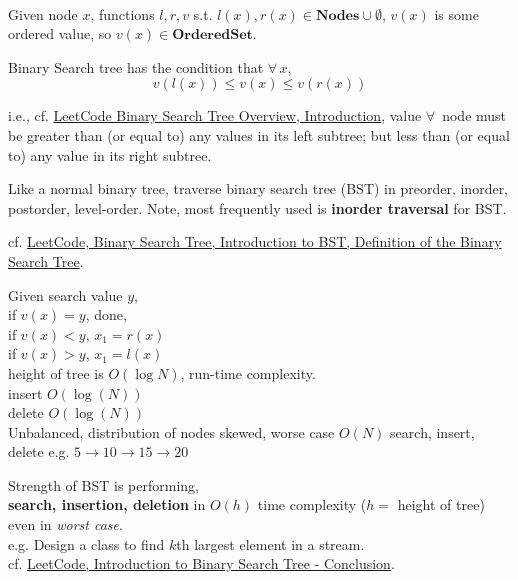 \documentclass[10pt]{amsart}
\begin{document}
\begin{multicols*}{2}
\quad \\

Given node $x$, functions $l, r, v$ s.t. $l(x), r(x) \in \textbf{Nodes} \cup \emptyset$, $v(x)$ is some ordered value, so $v(x) \in \textbf{OrderedSet}$. 

Binary Search tree has the condition that $\forall \, x$, 
\[
v(l(x)) \leq v(x) \leq v(r(x))
\]

i.e., cf. \href{https://leetcode.com/explore/learn/card/introduction-to-data-structure-binary-search-tree/}{LeetCode Binary Search Tree Overview, Introduction}, value $\forall \, $ node must be greater than (or equal to) any values in its left subtree; but less than (or equal to) any value in its right subtree.

Like a normal binary tree, traverse binary search tree (BST) in preorder, inorder, postorder, level-order. Note, most frequently used is \textbf{inorder traversal} for BST. 

cf. \href{https://leetcode.com/explore/learn/card/introduction-to-data-structure-binary-search-tree/140/introduction-to-a-bst/1017/}{LeetCode, Binary Search Tree, Introduction to BST, Definition of the Binary Search Tree}.



Given search value $y$, \\
if $v(x) = y$, done, \\
if $v(x) < y$, $x_1 = r(x)$ \\
if $v(x) > y$, $x_1= l(x)$ \\

height of tree is $O(\log{N})$, run-time complexity. \\
insert $O(\log{(N)})$ \\
delete $O(\log{(N)})$ \\

Unbalanced, distribution of nodes skewed, worse case $O(N)$ search, insert, delete e.g. $5 \to 10 \to 15 \to 20$

Strength of BST is performing, \\
\textbf{search, insertion, deletion} in $O(h)$ time complexity ($h = $ height of tree) even in \emph{worst case}. \\

e.g. Design a class to find $k$th largest element in a stream. \\

cf. \href{https://leetcode.com/explore/learn/card/introduction-to-data-structure-binary-search-tree/142/conclusion/1009/}{LeetCode, Introduction to Binary Search Tree - Conclusion}. 


\end{multicols*}
\end{document}
